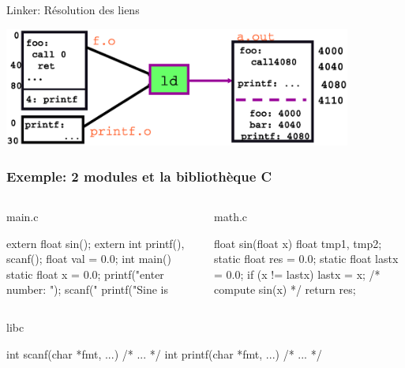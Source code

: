 \documentclass[11pt]{beamer}
\begin{document}
\begin{slide}{Linker: Résolution des liens}
\vspace*{-.2in}
\vspace*{-.1in}
\centerline{\includegraphics[width=4.5in]{figs/where}}
\end{slide}

\begin{frame}[fragile]
\frametitle{Exemple: 2 modules et la bibliothèque C}
\vspace*{-3mm}
\begin{columns}[T]
\begin{block}{main.c}%
\begin{ccode}
extern float sin();
extern int printf(), scanf();
float val = 0.0;
int main() {
  static float x = 0.0;
  printf("enter number: ");
  scanf("%
  printf("Sine is %
}
\end{ccode}
\end{block}
\begin{block}{math.c}
\begin{ccode}
float sin(float x) {
  float tmp1, tmp2;
  static float res = 0.0;
  static float lastx = 0.0;
  if (x != lastx) {
    lastx = x;
    /* compute sin(x) */
  }
  return res;
}
\end{ccode}
\end{block}
\end{columns}
\begin{block}{libc}
\begin{ccode}
int scanf(char *fmt, ...) { /* ... */ }
int printf(char *fmt, ...) { /* ... */ }
\end{ccode}
\end{block}
\end{frame}
\end{document}
